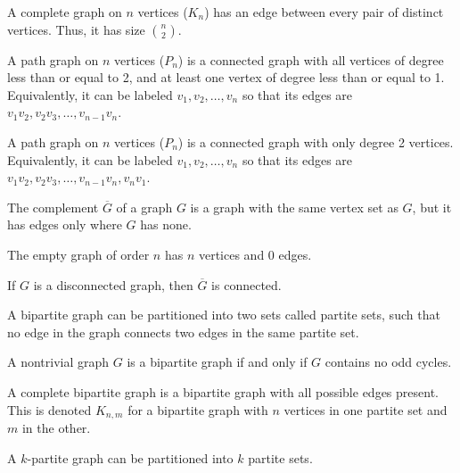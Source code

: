 \documentclass{article}
\begin{document}
\medskip
{}

    A complete graph on $n$ vertices ($K_n$) has an edge between every pair of distinct vertices.
    Thus, it has size ${n \choose 2}$.

\medskip
{}

    A path graph on $n$ vertices ($P_n$) is a connected graph with all vertices of degree less than or equal to 2, and at least one vertex of degree less than or equal to 1. Equivalently, it can be labeled $v_1, v_2, \hdots, v_n$ so that its edges are $v_1v_2, v_2v_3, \hdots, v_{n-1}v_n$.

\medskip
{}

    A path graph on $n$ vertices ($P_n$) is a connected graph with only degree 2 vertices. Equivalently, it can be labeled $v_1, v_2, \hdots, v_n$ so that its edges are $v_1v_2, v_2v_3, \hdots, v_{n-1}v_n, v_nv_1$.

\medskip
{}

    The complement $\overline G$ of a graph $G$ is a graph with the same vertex set as $G$, but it has edges only where $G$ has none.

\medskip
{}

    The empty graph of order $n$ has $n$ vertices and 0 edges.

\medskip
{}

    If $G$ is a disconnected graph, then $\overline G$ is connected.

\medskip
{}

    A bipartite graph can be partitioned into two sets called partite sets, such that no edge in the graph connects two edges in the same partite set.

\medskip
{}

    A nontrivial graph $G$ is a bipartite graph if and only if $G$ contains no odd cycles.

\medskip
{}

    A complete bipartite graph is a bipartite graph with all possible edges present. This is denoted $K_{n,m}$ for a bipartite graph with $n$ vertices in one partite set and $m$ in the other.

\medskip
{}

    A $k$-partite graph can be partitioned into $k$ partite sets.
\end{document}
